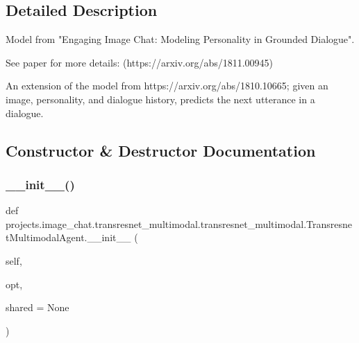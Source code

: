 \subsection{Detailed Description}
\begin{DoxyVerb}Model from "Engaging Image Chat: Modeling Personality in Grounded Dialogue".

See paper for more details: (https://arxiv.org/abs/1811.00945)

An extension of the model from https://arxiv.org/abs/1810.10665; given
an image, personality, and dialogue history, predicts the next utterance
in a dialogue.
\end{DoxyVerb}
 

\subsection{Constructor \& Destructor Documentation}
\mbox{\label{classprojects_1_1image__chat_1_1transresnet__multimodal_1_1transresnet__multimodal_1_1TransresnetMultimodalAgent_aeb8b0b2c932460122db8e86c155c3fa4}} 
\subsubsection{\texorpdfstring{\+\_\+\+\_\+init\+\_\+\+\_\+()}{\_\_init\_\_()}}
{\footnotesize\ttfamily def projects.\+image\+\_\+chat.\+transresnet\+\_\+multimodal.\+transresnet\+\_\+multimodal.\+Transresnet\+Multimodal\+Agent.\+\_\+\+\_\+init\+\_\+\+\_\+ (\begin{DoxyParamCaption}\item[{}]{self,  }\item[{}]{opt,  }\item[{}]{shared = {\ttfamily None} }\end{DoxyParamCaption})}



